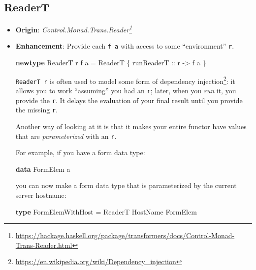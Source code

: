 \documentclass[]{article}
\newenvironment{Shaded}{}{}
\newcommand{\DataTypeTok}[1]{\textcolor[rgb]{0.56,0.13,0.00}{#1}}
\newcommand{\KeywordTok}[1]{\textcolor[rgb]{0.00,0.44,0.13}{\textbf{#1}}}
\newcommand{\NormalTok}[1]{#1}
\newcommand{\OtherTok}[1]{\textcolor[rgb]{0.00,0.44,0.13}{#1}}
\renewcommand{\href}[2]{#2\footnote{\url{#1}}}
\begin{document}
\subsection{ReaderT}\label{readert}

\begin{itemize}
\item
  \textbf{Origin}:
  \emph{\href{https://hackage.haskell.org/package/transformers/docs/Control-Monad-Trans-Reader.html}{Control.Monad.Trans.Reader}}
\item
  \textbf{Enhancement}: Provide each \texttt{f\ a} with access to some
  ``environment'' \texttt{r}.

\begin{Shaded}
\begin{Highlighting}[]
\KeywordTok{newtype} \DataTypeTok{ReaderT}\NormalTok{ r f a }\OtherTok{=} \DataTypeTok{ReaderT}\NormalTok{ \{}\OtherTok{ runReaderT ::}\NormalTok{ r }\OtherTok{{-}\textgreater{}}\NormalTok{ f a \}}
\end{Highlighting}
\end{Shaded}

  \texttt{ReaderT\ r} is often used to model some form of
  \href{https://en.wikipedia.org/wiki/Dependency_injection}{dependency
  injection}: it allows you to work ``assuming'' you had an \texttt{r}; later,
  when you \emph{run} it, you provide the \texttt{r}. It delays the evaluation
  of your final result until you provide the missing \texttt{r}.

  Another way of looking at it is that it makes your entire functor have values
  that are \emph{parameterized} with an \texttt{r}.

  For example, if you have a form data type:

\begin{Shaded}
\begin{Highlighting}[]
\KeywordTok{data} \DataTypeTok{FormElem}\NormalTok{ a}
\end{Highlighting}
\end{Shaded}

  you can now make a form data type that is parameterized by the current server
  hostname:

\begin{Shaded}
\begin{Highlighting}[]
\KeywordTok{type} \DataTypeTok{FormElemWithHost} \OtherTok{=} \DataTypeTok{ReaderT} \DataTypeTok{HostName} \DataTypeTok{FormElem}
\end{Highlighting}
\end{Shaded}


\end{itemize}
\end{document}
